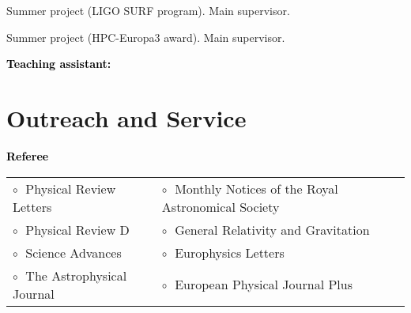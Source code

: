 \documentclass[a4paper]{moderncv}
\begin{document}
\vspace{0.1cm}
\vspace{-0.1cm}
\vspace{-0.0cm}
\hspace{0.8cm}Summer project (LIGO SURF program). Main supervisor.
\vspace{-0.0cm}

\vspace{0.1cm}
\vspace{-0.1cm}
\vspace{-0.0cm}
\hspace{0.8cm}Summer project (HPC-Europa3 award). Main supervisor.
\vspace{-0.0cm}


%
\vspace{0.2cm}
\textbf{\textcolor{black}{Teaching assistant:}}\vspace{0.05cm}\\
 \vspace{-0.1cm}


\section{Outreach and Service}

\textbf{\textcolor{black}{Referee}}\vspace{0.1cm}\\
\begin{tabular}{@{\hskip 0.4cm}l@{\hskip 0.4in}l}
$\circ\;$ Physical Review Letters & $\circ\;$ Monthly Notices of the Royal Astronomical Society \\
$\circ\;$ Physical Review D & $\circ\;$ General Relativity and Gravitation \\
$\circ\;$ Science Advances & $\circ\;$ Europhysics Letters \\
$\circ\;$ The Astrophysical Journal &  $\circ\;$ European Physical Journal Plus
\end{tabular}
\vspace{+0.15cm}
 
\end{document}
